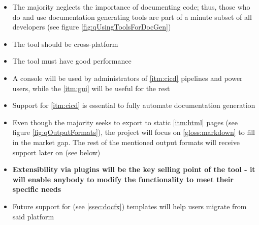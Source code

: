 \begin{itemize}
    \item The majority neglects the importance of documenting code; thus, those who do and use documentation generating tools are part of a minute subset of all developers (see figure \ref{fig:qUsingToolsForDocGen})
    \item The tool should be cross-platform
    \item The tool must have good performance
    \item A console will be used by administrators of \ref{itm:cicd} pipelines and power users, while the \ref{itm:gui} will be useful for the rest
    \item Support for \ref{itm:cicd} is essential to fully automate documentation generation
    \item Even though the majority seeks to export to static \ref{itm:html} pages (see figure \ref{fig:qOutputFormats}), the project will focus on \ref{gloss:markdown} to fill in the market gap. The rest of the mentioned output formats will receive support later on (see below)
    \item \textbf{Extensibility via plugins will be the key selling point of the tool - it will enable anybody to modify the functionality to meet their specific needs}
    \item Future support for  (see \ref{ssec:docfx}) templates will help users migrate from said platform
\end{itemize}